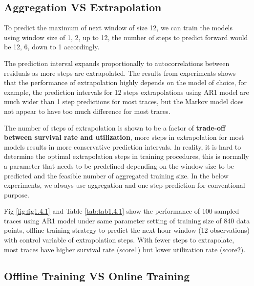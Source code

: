 \documentclass{article}
\begin{document}
\subsection{Aggregation VS Extrapolation}

\begin{flushleft}
To predict the maximum of next window of size 12, we can train the models using window size of 1, 2, up to 12, the number of steps to predict forward would be 12, 6, down to 1 accordingly.
\end{flushleft}

\begin{flushleft}
The prediction interval expands proportionally to autocorrelations between residuals as more steps are extrapolated. The results from experiments shows that the performance of extrapolation highly depends on the model of choice, for example, the prediction intervals for 12 steps extrapolations using AR1 model are much wider than 1 step predictions for most traces, but the Markov model does not appear to have too much difference for most traces.
\end{flushleft}

\begin{flushleft}
The number of steps of extrapolation is shown to be a factor of \textbf{trade-off between survival rate and utilization}, more steps in extrapolation for most models results in more conservative prediction intervals.
In reality, it is hard to determine the optimal extrapolation steps in training procedures, this is normally a parameter that needs to be predefined depending on the window size to be predicted and the feasible number of aggregated training size. In the below experiments, we always use aggregation and one step prediction for conventional purpose.
\end{flushleft}

\begin{flushleft}
Fig \ref{fig:fig1.4.1} and Table \ref{tab:tab1.4.1} show the performance of 100 sampled traces using AR1 model under same parameter setting of training size of 840 data points, offline training strategy to predict the next hour window (12 observations) with control variable of extrapolation steps. With fewer steps to extrapolate, most traces have higher survival rate (score1) but lower utilization rate (score2).
\end{flushleft}

\subsection{Offline Training VS Online Training}
\end{document}
